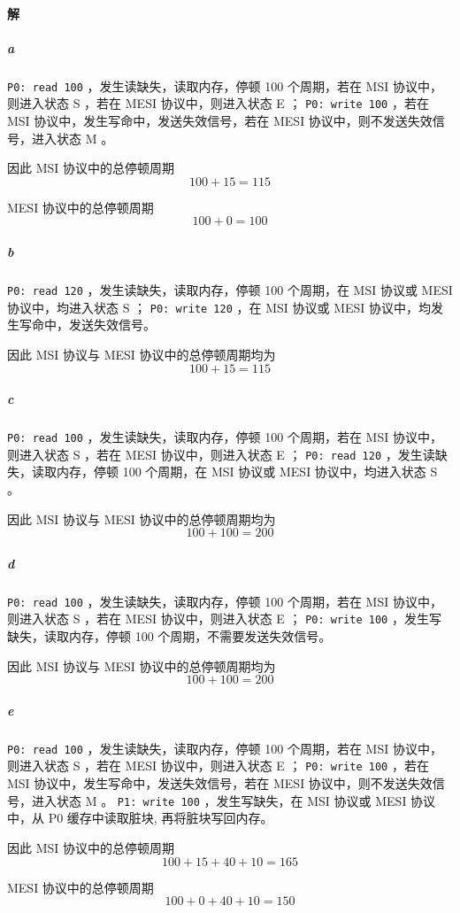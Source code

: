 \documentclass{article}
\begin{document}
\paragraph{解}
\subparagraph{a} \lstinline{P0: read 100} ，发生读缺失，读取内存，停顿 100 个周期，若在 MSI 协议中，则进入状态 S ，若在 MESI 协议中，则进入状态 E ； \lstinline{P0: write 100} ，若在 MSI 协议中，发生写命中，发送失效信号，若在 MESI 协议中，则不发送失效信号，进入状态 M 。

因此 MSI 协议中的总停顿周期
$$
    100 + 15 = 115
$$

MESI 协议中的总停顿周期
$$
    100 + 0 = 100
$$

\subparagraph{b} \lstinline{P0: read 120} ，发生读缺失，读取内存，停顿 100 个周期，在 MSI 协议或 MESI 协议中，均进入状态 S ； \lstinline{P0: write 120} ，在 MSI 协议或 MESI 协议中，均发生写命中，发送失效信号。

因此 MSI 协议与 MESI 协议中的总停顿周期均为
$$
    100 + 15 = 115
$$

\subparagraph{c} \lstinline{P0: read 100} ，发生读缺失，读取内存，停顿 100 个周期，若在 MSI 协议中，则进入状态 S ，若在 MESI 协议中，则进入状态 E ； \lstinline{P0: read 120} ，发生读缺失，读取内存，停顿 100 个周期，在 MSI 协议或 MESI 协议中，均进入状态 S 。

因此 MSI 协议与 MESI 协议中的总停顿周期均为
$$
    100 + 100 = 200
$$

\subparagraph{d} \lstinline{P0: read 100} ，发生读缺失，读取内存，停顿 100 个周期，若在 MSI 协议中，则进入状态 S ，若在 MESI 协议中，则进入状态 E ； \lstinline{P0: write 100} ，发生写缺失，读取内存，停顿 100 个周期，不需要发送失效信号。

因此 MSI 协议与 MESI 协议中的总停顿周期均为
$$
    100 + 100 = 200
$$

\subparagraph{e} \lstinline{P0: read 100} ，发生读缺失，读取内存，停顿 100 个周期，若在 MSI 协议中，则进入状态 S ，若在 MESI 协议中，则进入状态 E ； \lstinline{P0: write 100} ，若在 MSI 协议中，发生写命中，发送失效信号，若在 MESI 协议中，则不发送失效信号，进入状态 M 。 \lstinline{P1: write 100} ，发生写缺失，在 MSI 协议或 MESI 协议中，从 P0 缓存中读取脏块, 再将脏块写回内存。

因此 MSI 协议中的总停顿周期
$$
    100 + 15 + 40 + 10 = 165
$$

MESI 协议中的总停顿周期
$$
    100 + 0 + 40 + 10 = 150
$$
\end{document}
